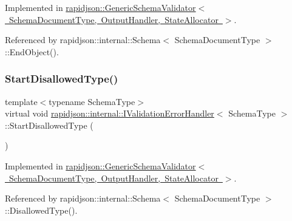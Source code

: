 Implemented in \mbox{\hyperlink{classrapidjson_1_1_generic_schema_validator_a980ede674d2e3383266ce3f11e998ff2}{rapidjson\+::\+Generic\+Schema\+Validator$<$ Schema\+Document\+Type, Output\+Handler, State\+Allocator $>$}}.



Referenced by rapidjson\+::internal\+::\+Schema$<$ Schema\+Document\+Type $>$\+::\+End\+Object().

\mbox{\label{classrapidjson_1_1internal_1_1_i_validation_error_handler_a86596fb1c495f10fe08d598d29525ae1}} 
\subsubsection{\texorpdfstring{StartDisallowedType()}{StartDisallowedType()}}
{\footnotesize\ttfamily template$<$typename Schema\+Type$>$ \\
virtual void \mbox{\hyperlink{classrapidjson_1_1internal_1_1_i_validation_error_handler}{rapidjson\+::internal\+::\+I\+Validation\+Error\+Handler}}$<$ Schema\+Type $>$\+::Start\+Disallowed\+Type (\begin{DoxyParamCaption}{ }\end{DoxyParamCaption})\hspace{0.3cm}{\ttfamily [pure virtual]}}



Implemented in \mbox{\hyperlink{classrapidjson_1_1_generic_schema_validator_a6032d1e04492a898ff2134006bd9d675}{rapidjson\+::\+Generic\+Schema\+Validator$<$ Schema\+Document\+Type, Output\+Handler, State\+Allocator $>$}}.



Referenced by rapidjson\+::internal\+::\+Schema$<$ Schema\+Document\+Type $>$\+::\+Disallowed\+Type().

\mbox{\label{classrapidjson_1_1internal_1_1_i_validation_error_handler_aff210754c381fc2c79a3de0be7d7af23}} 
